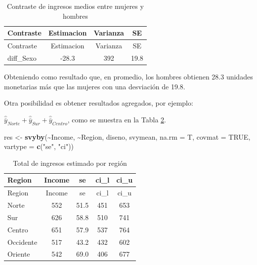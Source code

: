 \documentclass[
  spanish,
  12pt,
]{book}
\newenvironment{Shaded}{\begin{snugshade}}{\end{snugshade}}
\newcommand{\AttributeTok}[1]{\textcolor[rgb]{0.13,0.29,0.53}{#1}}
\newcommand{\ConstantTok}[1]{\textcolor[rgb]{0.56,0.35,0.01}{#1}}
\newcommand{\FunctionTok}[1]{\textcolor[rgb]{0.13,0.29,0.53}{\textbf{#1}}}
\newcommand{\NormalTok}[1]{#1}
\newcommand{\OtherTok}[1]{\textcolor[rgb]{0.56,0.35,0.01}{#1}}
\newcommand{\SpecialCharTok}[1]{\textcolor[rgb]{0.81,0.36,0.00}{\textbf{#1}}}
\newcommand{\StringTok}[1]{\textcolor[rgb]{0.31,0.60,0.02}{#1}}
\begin{document}
\begin{longtable}[]{@{}lccc@{}}
\caption{\label{tab:tab-contraste-sexo}Contraste de ingresos medios entre mujeres y hombres}\tabularnewline
\toprule\noalign{}
Contraste & Estimacion & Varianza & SE \\
\midrule\noalign{}
\endfirsthead
\toprule\noalign{}
Contraste & Estimacion & Varianza & SE \\
\midrule\noalign{}
\endhead
\bottomrule\noalign{}
\endlastfoot
diff\_Sexo & -28.3 & 392 & 19.8 \\
\end{longtable}

Obteniendo como resultado que, en promedio, los hombres obtienen 28.3 unidades monetarias más que las mujeres con una desviación de 19.8.

Otra posibilidad es obtener resultados agregados, por ejemplo:

\(\hat{\bar{y}}_{Norte}+\hat{\bar{y}}_{Sur} +\hat{\bar{y}}_{Centro}\), como se muestra en la Tabla \ref{tab:tab-total-region}.

\begin{Shaded}
\begin{Highlighting}[]
\NormalTok{res }\OtherTok{\textless{}{-}} \FunctionTok{svyby}\NormalTok{(}\SpecialCharTok{\textasciitilde{}}\NormalTok{Income,  }\SpecialCharTok{\textasciitilde{}}\NormalTok{Region,}
\NormalTok{              diseno, }
\NormalTok{              svymean, }\AttributeTok{na.rm =}\NormalTok{ T,}
              \AttributeTok{covmat =} \ConstantTok{TRUE}\NormalTok{,}
              \AttributeTok{vartype =} \FunctionTok{c}\NormalTok{(}\StringTok{"se"}\NormalTok{, }\StringTok{"ci"}\NormalTok{))}
\end{Highlighting}
\end{Shaded}

\begin{longtable}[]{@{}lcccc@{}}
\caption{\label{tab:tab-total-region}Total de ingresos estimado por región}\tabularnewline
\toprule\noalign{}
Region & Income & se & ci\_l & ci\_u \\
\midrule\noalign{}
\endfirsthead
\toprule\noalign{}
Region & Income & se & ci\_l & ci\_u \\
\midrule\noalign{}
\endhead
\bottomrule\noalign{}
\endlastfoot
Norte & 552 & 51.5 & 451 & 653 \\
Sur & 626 & 58.8 & 510 & 741 \\
Centro & 651 & 57.9 & 537 & 764 \\
Occidente & 517 & 43.2 & 432 & 602 \\
Oriente & 542 & 69.0 & 406 & 677 \\
\end{longtable}
\end{document}
